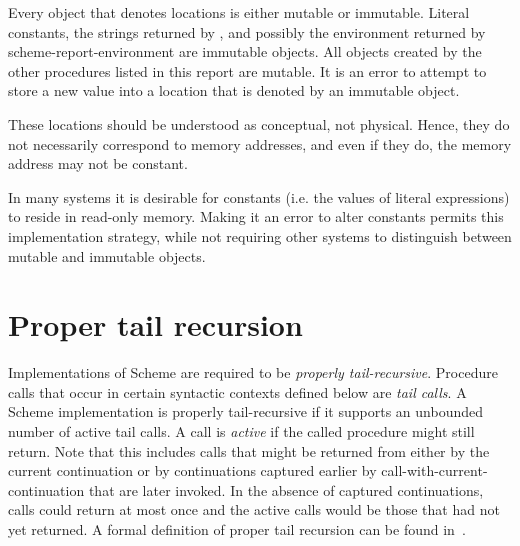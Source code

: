 Every object that denotes locations is 
either mutable or
immutable.  Literal constants, the strings
returned by ,
and possibly the environment returned by {\cf scheme-report-environment}
are immutable objects.  All objects
created by the other procedures listed in this report are mutable.
It is an
error to attempt to store a new value into a location that is denoted by an
immutable object.

These locations should be understood as conceptual, not physical.
Hence, they do not necessarily correspond to memory addresses,
and even if they do, the memory address may not be constant.

\begin{rationale}
In many systems it is desirable for constants (i.e. the values of
literal expressions) to reside in read-only memory.
Making it an error to alter constants permits this implementation strategy,
while not requiring other systems to distinguish between
mutable and immutable objects.
\end{rationale}

\section{Proper tail recursion}
\label{proper tail recursion}

Implementations of Scheme are required to be
{\em properly tail-recursive}.
Procedure calls that occur in certain syntactic
contexts defined below are {\em tail calls}.  A Scheme implementation is
properly tail-recursive if it supports an unbounded number of active
tail calls.  A call is {\em active} if the called procedure might still
return.  Note that this includes calls that might be returned from either
by the current continuation or by continuations captured earlier by
{\cf call-with-current-continuation} that are later invoked.
In the absence of captured continuations, calls could
return at most once and the active calls would be those that had not
yet returned.
A formal definition of proper tail recursion can be found
in~\cite{propertailrecursion}.


